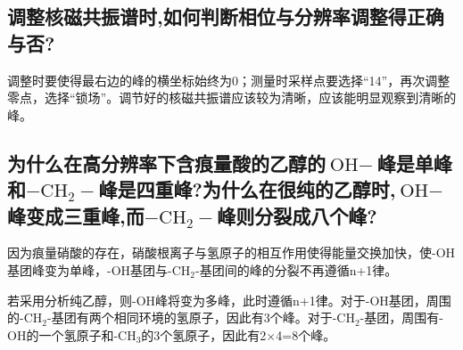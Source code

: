 \documentclass[a4paper]{article}
\begin{document}
\subsection{调整核磁共振谱时,如何判断相位与分辨率调整得正确与否?}
调整时要使得最右边的峰的横坐标始终为0；测量时采样点要选择“14”，再次调整零点，选择“锁场”。调节好的核磁共振谱应该较为清晰，应该能明显观察到清晰的峰。
\subsection{为什么在高分辨率下含痕量酸的乙醇的$\text{OH}-$峰是单峰和$-\text{CH}_2-$峰是四重峰?为什么在很纯的乙醇时,$\text{OH}-$峰变成三重峰,而$-\text{CH}_2-$峰则分裂成八个峰?}
因为痕量硝酸的存在，硝酸根离子与氢原子的相互作用使得能量交换加快，使-OH基团峰变为单峰，-OH基团与-CH$_2$-基团间的峰的分裂不再遵循n+1律。

若采用分析纯乙醇，则-OH峰将变为多峰，此时遵循n+1律。对于-OH基团，周围的-CH$_2$-基团有两个相同环境的氢原子，因此有3个峰。对于-CH$_2$-基团，周围有-OH的一个氢原子和-CH$_3$的3个氢原子，因此有2$\times$4=8个峰。

\nocite{jiaocai}

\end{document}
